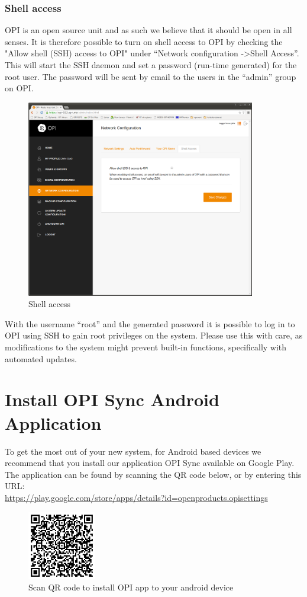 \documentclass[12pt,a4paper,titlepage]{article}
\begin{document}
\subsubsection{Shell access}
OPI is an open source unit and as such we believe that it should be open in all senses. It is therefore possible to turn on shell access to OPI by checking the "Allow shell (SSH) access to OPI" under ``Network configuration -\textgreater Shell Access''. This will start the SSH daemon and set a password (run-time generated) for the root user. The password will be sent by email to the users in the ``admin'' group on OPI.
\begin{figure}[h!]
\centering
\includegraphics[width=10cm]{./img/network-shell}
\caption{Shell access}
\end{figure}
\FloatBarrier
With the username ``root'' and the generated password it is possible to log in to OPI using SSH to gain root privileges on the system. Please use this with care, as modifications to the system might prevent built-in functions, specifically with automated updates.

\newpage
\section{Install OPI Sync Android Application}
To get the most out of your new system, for Android based devices we recommend that you install our application OPI Sync available on Google Play.
The application can be found by scanning the QR code below, or by entering this URL: \\
\href{https://play.google.com/store/apps/details?id=openproducts.opisettings}{https://play.google.com/store/apps/details?id=openproducts.opisettings}
\begin{figure}[h!]
\centering
\includegraphics[width=3cm]{./img/qr-code-opi-settings}
\caption{Scan QR code to install OPI app to your android device}
\end{figure}
\end{document}
